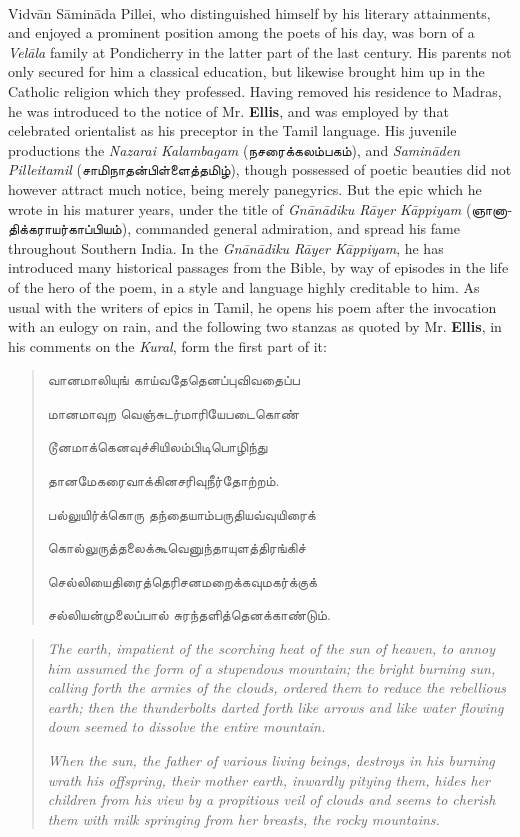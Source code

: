 \documentclass{article}
\newcommand{\TamilText}[1]{\texttamil{#1}}
\newcommand{\tam}[1]{\TamilText{#1}}
\begin{document}
\paragraph{}
Vidv\={a}n S\={a}min\={a}da Pillei, who distinguished himself by his literary attainments, and enjoyed a prominent position among the poets of his day, was born of a \emph{Vel\={a}la} family at Pondicherry in the latter part of the last century. His parents not only secured for him a classical education, but likewise brought him up in the Catholic religion which they professed. Having removed his residence to Madras, he was introduced to the notice of Mr. \textbf{Ellis}, and was employed by that celebrated orientalist as his preceptor in the Tamil language. His juvenile productions the \emph{Nazarai Kalambagam} (\tam{நசரைக்கலம்பகம்}), and \emph{Samin\={a}den Pilleitamil} (\tam{சாமிநாதன்பிள்ளைத்தமிழ்}), though possessed of poetic beauties did not however attract much notice, being merely panegyrics. But the epic which he wrote in his maturer years, under the title of \emph{Gn\={a}n\={a}diku R\={a}yer K\={a}ppiyam} (\tam{ஞானாதிக்கராயர்காப்பியம்}), commanded general admiration, and spread his fame throughout Southern India. In the \emph{Gn\={a}n\={a}diku R\={a}yer K\={a}ppiyam}, he has introduced many historical passages from the Bible, by way of episodes in the life of the hero of the poem, in a style and language highly creditable to him. As usual with the writers of epics in Tamil, he opens his poem after the invocation with an eulogy on rain, and the following two stanzas as quoted by Mr. \textbf{Ellis}, in his comments on the \emph{Kural}, form the first part of it:
\begin{quotation}\small
\tam{வானமாலியுங்‌ காய்வதேதெனப்புவிவதைப்ப}

\tam{மானமாவுற வெஞ்சுடர்மாரியேபடைகொண்}

\tam{டூனமாக்கெனவுச்சியிலம்பிடிபொழிந்து}

\tam{தானமேகரைவாக்கினசரிவுநீர்தோற்றம்‌}.

\bigskip

\tam{பல்லுயிர்க்கொரு தந்தையாம்பருதியவ்வுயிரைக்‌}

\tam{கொல்லுருத்தலைக்கூவெனுந்தாயுளத்திரங்கிச்‌}

\tam{செல்லியைதிரைத்தெரிசனமறைக்கவுமகர்க்குக்}

\tam{சல்லியன்‌முலைப்பால்‌ சுரந்தளித்தெனக்காண்டும்}.
\end{quotation}
\begin{quotation}\small
\emph{The earth, impatient of the scorching heat of the sun of heaven, to annoy him assumed the form of a stupendous mountain; the bright burning sun, calling forth the armies of the clouds, ordered them to reduce the rebellious earth; then the thunderbolts darted forth like arrows and like water flowing down seemed to dissolve the entire mountain.}

\emph{When the sun, the father of various living beings, destroys in his burning wrath his offspring, their mother earth, inwardly pitying them, hides her children from his view by a propitious veil of clouds and seems to cherish them with milk springing from her breasts, the rocky mountains.}
\end{quotation}
\end{document}
